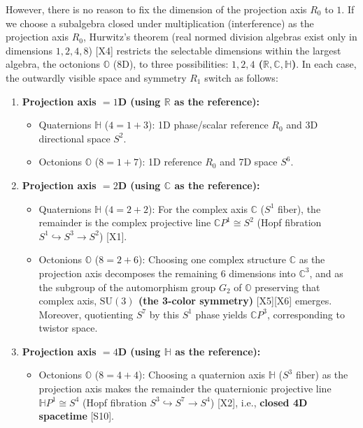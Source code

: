 \documentclass[
  a4paper,
]{article}
\providecommand{\tightlist}{%
  \setlength{\itemsep}{0pt}\setlength{\parskip}{0pt}}
\begin{document}
However, there is no reason to fix the dimension of the projection axis
\(R_0\) to \(1\). If we choose a subalgebra closed under multiplication
(interference) as the projection axis \(R_0\), Hurwitz's theorem (real
normed division algebras exist only in dimensions \(1, 2, 4, 8\))
{[}X4{]} restricts the selectable dimensions within the largest algebra,
the octonions \(\mathbb{O}\) (8D), to three possibilities:
\textbf{\(1, 2, 4\) (\(\mathbb{R}, \mathbb{C}, \mathbb{H}\))}. In each
case, the outwardly visible space and symmetry \(R_1\) switch as
follows:

\begin{enumerate}
\def\labelenumi{\arabic{enumi}.}
\tightlist
\item
  \textbf{Projection axis \(= 1\)D (using \(\mathbb{R}\) as the
  reference):}

  \begin{itemize}
  \tightlist
  \item
    Quaternions \(\mathbb{H}\) (\(4 = 1 + 3\)): 1D phase/scalar
    reference \(R_0\) and 3D directional space \(S^2\).
  \item
    Octonions \(\mathbb{O}\) (\(8 = 1 + 7\)): 1D reference \(R_0\) and
    7D space \(S^6\).
  \end{itemize}
\item
  \textbf{Projection axis \(= 2\)D (using \(\mathbb{C}\) as the
  reference):}

  \begin{itemize}
  \tightlist
  \item
    Quaternions \(\mathbb{H}\) (\(4 = 2 + 2\)): For the complex axis
    \(\mathbb{C}\) (\(S^1\) fiber), the remainder is the complex
    projective line \(\mathbb{C}P^1 \cong S^2\) (Hopf fibration
    \(S^1 \hookrightarrow S^3 \to S^2\)) {[}X1{]}.
  \item
    Octonions \(\mathbb{O}\) (\(8 = 2 + 6\)): Choosing one complex
    structure \(\mathbb{C}\) as the projection axis decomposes the
    remaining 6 dimensions into \(\mathbb{C}^3\), and as the subgroup of
    the automorphism group \(G_2\) of \(\mathbb{O}\) preserving that
    complex axis, \textbf{\(\mathrm{SU}(3)\) (the 3-color symmetry)}
    {[}X5{]}{[}X6{]} emerges. Moreover, quotienting \(S^7\) by this
    \(S^1\) phase yields \(\mathbb{C}P^3\), corresponding to twistor
    space.
  \end{itemize}
\item
  \textbf{Projection axis \(= 4\)D (using \(\mathbb{H}\) as the
  reference):}

  \begin{itemize}
  \tightlist
  \item
    Octonions \(\mathbb{O}\) (\(8 = 4 + 4\)): Choosing a quaternion axis
    \(\mathbb{H}\) (\(S^3\) fiber) as the projection axis makes the
    remainder the quaternionic projective line
    \(\mathbb{H}P^1 \cong S^4\) (Hopf fibration
    \(S^3 \hookrightarrow S^7 \to S^4\)) {[}X2{]}, i.e., \textbf{closed
    4D spacetime} {[}S10{]}.
  \end{itemize}
\end{enumerate}
\end{document}

